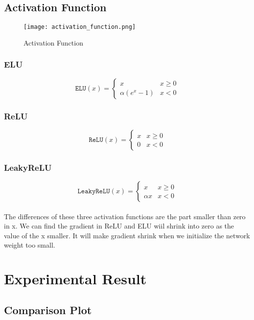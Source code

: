 \subsection{Activation Function}
\begin{figure}[!ht]
    \begin{center} 
        \texttt{[image: activation\_function.png]} 
        \caption{Activation Function}
    \end{center} 
\end{figure}
\subsubsection{ELU}
$$\texttt{ELU}(x)=\left\{\begin{matrix}
x & x \geq 0\\ 
\alpha (e^x-1) & x < 0
\end{matrix}\right.$$
\subsubsection{ReLU}
$$\texttt{ReLU}(x)=\left\{\begin{matrix}
x & x \geq 0\\ 
0 & x < 0
\end{matrix}\right.$$
\subsubsection{LeakyReLU}
$$\texttt{LeakyReLU}(x)=\left\{\begin{matrix}
x & x \geq 0\\ 
\alpha x & x < 0
\end{matrix}\right.$$
\paragraph{}
The differences of these three activation functions are the part smaller than zero in x. We can find the gradient in ReLU and ELU wiil shrink into zero as the value of the x smaller. It will make gradient shrink when we initialize the network weight too small.
\section{Experimental Result}
\subsection{Comparison Plot}
